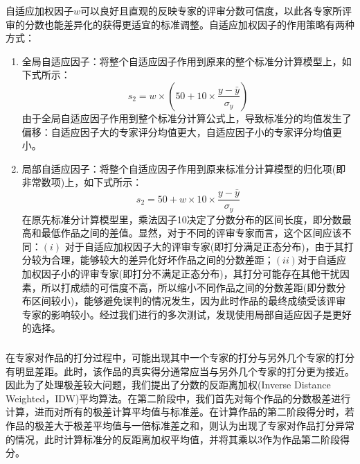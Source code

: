 \documentclass[bwprint]{gmcmthesis}
\begin{document}
	自适应加权因子$w$可以良好且直观的反映专家的评审分数可信度，以此各专家所评审的分数也能差异化的获得更适宜的标准调整。自适应加权因子的作用策略有两种方式：
	\begin{enumerate}
		\item 全局自适应因子：将整个自适应因子作用到原来的整个标准分计算模型上，如下式所示：
		\begin{equation}
		s_2=w\times\left( 50+10\times\frac{y-\bar{y}}{\sigma_y}\right) 
		\end{equation}
		由于全局自适应因子作用到整个标准分计算公式上，导致标准分的均值发生了偏移：自适应因子大的专家评分均值更大，自适应因子小的专家评分均值更小。
		
		\item 局部自适应因子：将整个自适应因子作用到原来标准分计算模型的归化项(即非常数项)上，如下式所示：
			\begin{equation}
		s_2=50+w\times10\times\frac{y-\bar{y}}{\sigma_y}
		\end{equation}
		在原先标准分计算模型里，乘法因子10决定了分数分布的区间长度，即分数最高和最低作品之间的差值。显然，对于不同的评审专家而言，这个区间应该不同：$(i)$ 对于自适应加权因子大的评审专家(即打分满足正态分布)，由于其打分较为合理，能够较大的差异化好坏作品之间的分数差距；$(ii)$对于自适应加权因子小的评审专家(即打分不满足正态分布)，其打分可能存在其他干扰因素，所以打成绩的可信度不高，所以缩小不同作品之间的分数差距(即分数分布区间较小)，能够避免误判的情况发生，因为此时作品的最终成绩受该评审专家的影响较小。经过我们进行的多次测试，发现使用局部自适应因子是更好的选择。
	\end{enumerate}

	\subsubsection{}
	在专家对作品的打分过程中，可能出现其中一个专家的打分与另外几个专家的打分有明显差距。此时，该作品的真实得分通常应当与另外几个专家的打分更为接近。
	因此为了处理极差较大问题，我们提出了分数的反距离加权(Inverse Distance Weighted，IDW)平均算法。在第二阶段中，我们首先对每个作品的分数极差进行计算，进而对所有的极差计算平均值与标准差。在计算作品的第二阶段得分时，若作品的极差大于极差平均值与一倍标准差之和，则认为出现了专家对作品打分异常的情况，此时计算标准分的反距离加权平均值，并将其乘以3作为作品第二阶段得分。
	
\end{document}
